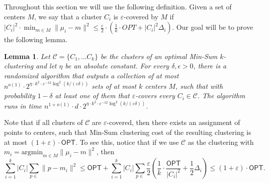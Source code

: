 \documentclass[11pt]{article}
\newtheorem{lemma}[theorem]{Lemma}
\def \OPT    {\mdef{\mathsf{OPT}}}
\newcommand{\mdef}[1]{{\ensuremath{#1}}\xspace}  %
\begin{document}
Throughout this section we will use the following definition. Given a set of centers $M$, we say that a cluster $C_i$ is $\varepsilon$-covered by $M$ if $|C_i|^2\cdot \min_{m\in M}\|\mu_i-m\|^2\leq \frac{\varepsilon}{2}\cdot \left(\frac{1}{k}\cdot OPT + |C_i|^2 \Delta_i\right)$.
Our goal will be to prove the following lemma.
\begin{lemma}
\label{lem:approxmeans}
    Let $\mathcal{C}=\{C_1,\ldots C_k\}$ be the clusters of an optimal Min-Sum $k$-clustering and let $\eta$ be an absolute constant.
    For every $\delta, \epsilon > 0$, there is a randomized algorithm that 
    outputs a collection of at most $n^{o(1)} \cdot 2^{\eta\cdot k^2 \cdot \varepsilon^{-12} \log^2(k/(\varepsilon\delta))}$ sets of at most $k$ centers $M$, such that with probability $1 -\delta$ at least one of them that $\varepsilon$-covers every $C_i \in \mathcal{C}$. The algorithm runs in time $n^{1+o(1)} \cdot d \cdot 2^{\eta\cdot k^2 \cdot \varepsilon^{-12} \log^2(k/(\varepsilon\delta))}$.
\end{lemma}

Note that if all clusters of $\mathcal{C}$ are $\varepsilon$-covered, then there exists an assignment of points to centers, such that Min-Sum clustering cost of the resulting clustering is at most $(1+\varepsilon)\cdot \OPT$. To see this, notice that if we use $\mathcal{C}$ as the clustering with $m_i=\text{argmin}_{m\in M}\|\mu_i-m\|^2$, then 
$$\sum_{i=1}^k |C_i| \sum_{p\in} \|p-m_i\|^2 \leq \OPT + \sum_{i=1}^k |C_i| \sum_{p\in} \frac{\varepsilon}{2} \left(\frac{1}{k}\cdot \frac{\OPT}{|C_i|^2} + \frac{1}{2}\Delta_i\right) \leq (1+\varepsilon)\cdot \OPT.$$




\end{document}
